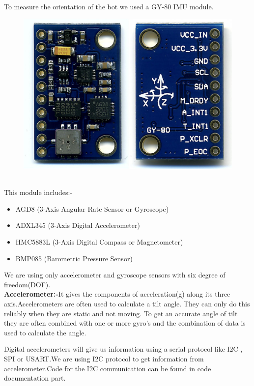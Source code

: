 \documentclass[12pt]{report}
\begin{document}
	\begin{quote}
	\end{quote} 
To measure the orientation of the bot we used a GY-80 IMU module.
\begin{figure}[h]
	\centering
	\includegraphics[scale=0.1]{gy80.jpg}
\end{figure} \\
This module includes:-
\begin{itemize}
	\item AGD8 (3-Axis Angular Rate Sensor or Gyroscope)
	\item ADXL345 (3-Axis Digital Accelerometer)
	\item HMC5883L (3-Axis Digital Compass or Magnetometer)
	\item BMP085 (Barometric Pressure Sensor)
\end{itemize} 
We are using only accelerometer and gyroscope sensors with six degree of freedom(DOF).\\
\textbf{Accelerometer:-}It gives the components of acceleration(g) along its three axis.Accelerometers are often used to calculate a tilt angle. They can only do this reliably when they are static and not moving. To get an accurate angle of tilt they are often combined with one or more gyro's and the combination of data is used to calculate the angle.

Digital accelerometers will give us information using a serial protocol like I2C , SPI or USART.We are using I2C protocol to get information from accelerometer.Code for the I2C communication can be found in code documentation part.
\end{document}
